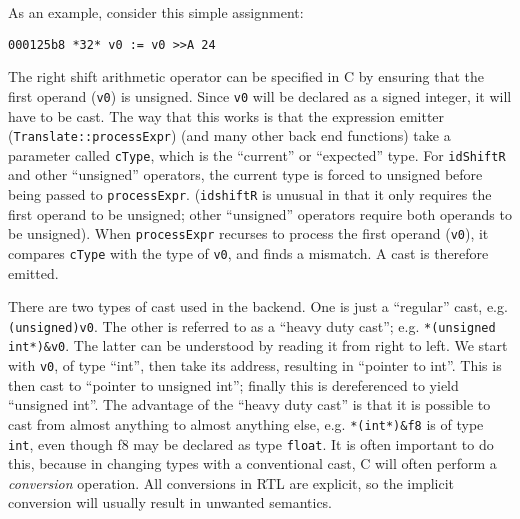 As an example, consider this simple assignment:
\begin{verbatim}
000125b8 *32* v0 := v0 >>A 24
\end{verbatim}

The right shift arithmetic operator can be specified in C by ensuring that the
first operand (\texttt{v0}) is unsigned. Since \texttt{v0} will be declared
as a signed integer, it will have to be cast.
The way that this works is that the expression
emitter (\texttt{Translate::processExpr}) (and many other back end functions)
take a parameter called \texttt{cType}, which is the ``current'' or
``expected'' type. For \texttt{idShiftR} and other ``unsigned'' operators,
the current type is forced to unsigned before being passed to
\texttt{processExpr}. (\texttt{idshiftR} is unusual in that it only requires
the first operand to be unsigned; other ``unsigned'' operators require
both operands to be unsigned). When \texttt{processExpr} recurses to process
the first operand (\texttt{v0}), it compares \texttt{cType} with the type
of \texttt{v0}, and finds a mismatch. A cast is therefore emitted.

There are two types of cast used in the backend. One is just a ``regular''
cast, e.g. \texttt{(unsigned)v0}. The other is referred to as a ``heavy
duty cast''; e.g. \texttt{*(unsigned int*)\&v0}. The latter can be understood
by reading it from right to left. We start with \texttt{v0}, of type ``int'',
then take its address, resulting in ``pointer to int''.
This is then cast to ``pointer to unsigned
int''; finally this is dereferenced to yield ``unsigned int''. The advantage
of the ``heavy duty cast'' is that it is possible to cast from almost anything
to almost anything else, e.g. \texttt{*(int*)\&f8} is of type \texttt{int},
even though f8 may be declared as type \texttt{float}. It is often important
to do this, because in changing types with a conventional cast, C will often
perform a \emph{conversion} operation. All conversions in RTL are explicit,
so the implicit conversion will usually result in unwanted semantics.

